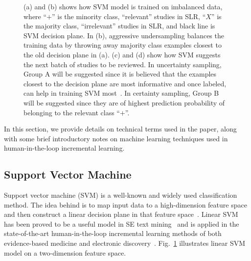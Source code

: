 \documentclass{svjour3}
\theoremstyle{break}
\begin{document}
\begin{figure}[!t]
    \centering
    \quad
    
    \caption{(a) and (b) shows how SVM model is trained on imbalanced data, where ``$+$'' is the minority class, ``relevant'' studies in SLR, ``$X$'' is the majority class, ``irrelevant'' studies in SLR, and black line is SVM decision plane. In (b), aggressive undersampling balances the training data by throwing away majority class examples closest to the old decision plane in (a). (c) and (d) show how SVM suggests the next batch of studies to be reviewed. In uncertainty sampling, Group A will be suggested since it is believed that the examples closest to the decision plane are most informative and once labeled, can help in training SVM most~\cite{settles2012active}. In certainty sampling, Group B will be suggested since they are of highest prediction probability of belonging to the relevant class ``$+$''.}
    \label{fig:SVM}
\end{figure}

In this section, we provide details on technical terms 
used in the paper,  along with some brief introductory
notes on machine learning techniques used in human-in-the-loop incremental learning.

\subsection{Support Vector Machine}
\label{sect: Support Vector Machine}

Support vector machine (SVM) is a well-known and widely used classification method. The idea behind is to map input data to a high-dimension feature space and then construct a linear decision plane in that feature space~\cite{cortes1995support}. Linear SVM~\cite{joachims2006training} has been proved to be a useful model in SE text mining~\cite{krishna2016bigse} and is applied in the state-of-the-art human-in-the-loop incremental learning methods of both evidence-based medicine and electronic discovery~\cite{wallace2010semi,cormack2014evaluation}. Fig.~\ref{fig:SVM} illustrates linear SVM model on a two-dimension feature space.
\end{document}
